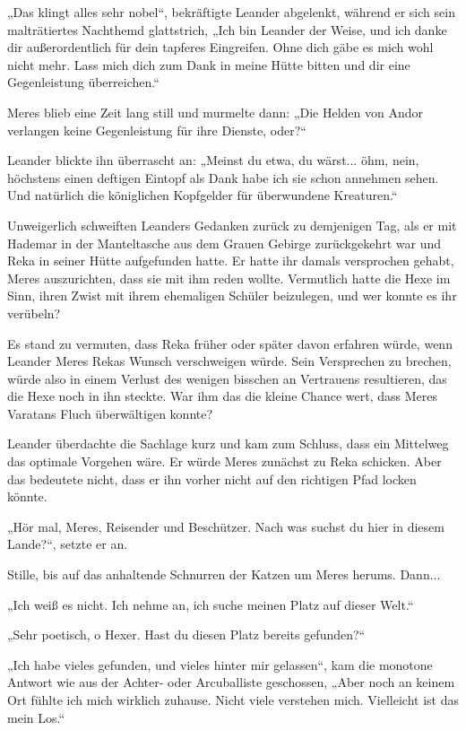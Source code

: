 „Das klingt alles sehr nobel“, bekräftigte Leander abgelenkt, während er sich sein malträtiertes Nachthemd glattstrich, „Ich bin Leander der Weise, und ich danke dir außerordentlich für dein tapferes Eingreifen. Ohne dich gäbe es mich wohl nicht mehr. Lass mich dich zum Dank in meine Hütte bitten und dir eine Gegenleistung überreichen.“

Meres blieb eine Zeit lang still und murmelte dann: „Die Helden von Andor verlangen keine Gegenleistung für ihre Dienste, oder?“

Leander blickte ihn überrascht an: „Meinst du etwa, du wärst... öhm, nein, höchstens einen deftigen Eintopf als Dank habe ich sie schon annehmen sehen. Und natürlich die königlichen Kopfgelder für überwundene Kreaturen.“

Unweigerlich schweiften Leanders Gedanken zurück zu demjenigen Tag, als er mit Hademar in der Manteltasche aus dem Grauen Gebirge zurückgekehrt war und Reka in seiner Hütte aufgefunden hatte. Er hatte ihr damals versprochen gehabt, Meres auszurichten, dass sie mit ihm reden wollte. Vermutlich hatte die Hexe im Sinn, ihren Zwist mit ihrem ehemaligen Schüler beizulegen, und wer konnte es ihr verübeln?

Es stand zu vermuten, dass Reka früher oder später davon erfahren würde, wenn Leander Meres Rekas Wunsch verschweigen würde. Sein Versprechen zu brechen, würde also in einem Verlust des wenigen bisschen an Vertrauens resultieren, das die Hexe noch in ihn steckte. War ihm das die kleine Chance wert, dass Meres Varatans Fluch überwältigen konnte?

Leander überdachte die Sachlage kurz und kam zum Schluss, dass ein Mittelweg das optimale Vorgehen wäre. Er würde Meres zunächst zu Reka schicken. Aber das bedeutete nicht, dass er ihn vorher nicht auf den richtigen Pfad locken könnte.

„Hör mal, Meres, Reisender und Beschützer. Nach was suchst du hier in diesem Lande?“, setzte er an.

Stille, bis auf das anhaltende Schnurren der Katzen um Meres herums. Dann...

„Ich weiß es nicht. Ich nehme an, ich suche meinen Platz auf dieser Welt.“

„Sehr poetisch, o Hexer. Hast du diesen Platz bereits gefunden?“

„Ich habe vieles gefunden, und vieles hinter mir gelassen“, kam die monotone Antwort wie aus der Achter- oder Arcuballiste geschossen, „Aber noch an keinem Ort fühlte ich mich wirklich zuhause. Nicht viele verstehen mich. Vielleicht ist das mein Los.“

